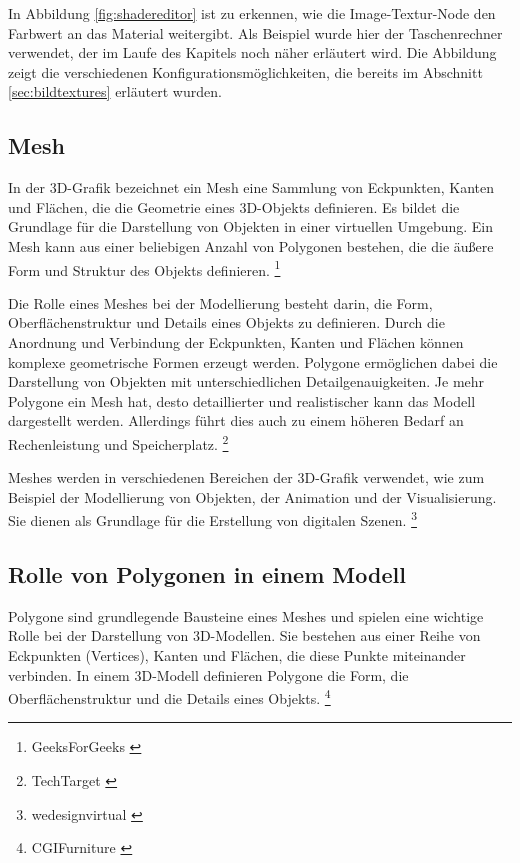 In Abbildung \ref{fig:shadereditor} ist zu erkennen, wie die Image-Textur-Node den Farbwert an das Material weitergibt. Als Beispiel wurde hier der Taschenrechner verwendet, der im Laufe des Kapitels noch näher erläutert wird. Die Abbildung zeigt die verschiedenen Konfigurationsmöglichkeiten, die bereits im Abschnitt \ref{sec:bildtextures} erläutert wurden.

\subsection{Mesh} \label{sec:mesh}
In der 3D-Grafik bezeichnet ein Mesh eine Sammlung von Eckpunkten, Kanten und Flächen, die die Geometrie eines 3D-Objekts definieren. Es bildet die Grundlage für die Darstellung von Objekten in einer virtuellen Umgebung. Ein Mesh kann aus einer beliebigen Anzahl von Polygonen bestehen, die die äußere Form und Struktur des Objekts definieren. \footnote{GeeksForGeeks \cite{Mesh Definition}}

Die Rolle eines Meshes bei der Modellierung besteht darin, die Form, Oberflächenstruktur und Details eines Objekts zu definieren. Durch die Anordnung und Verbindung der Eckpunkten, Kanten und Flächen können komplexe geometrische Formen erzeugt werden. Polygone ermöglichen dabei die Darstellung von Objekten mit unterschiedlichen Detailgenauigkeiten. Je mehr Polygone ein Mesh hat, desto detaillierter und realistischer kann das Modell dargestellt werden. Allerdings führt dies auch zu einem höheren Bedarf an Rechenleistung und Speicherplatz. \footnote{TechTarget \cite{Mesh Usages}}

Meshes werden in verschiedenen Bereichen der 3D-Grafik verwendet, wie zum Beispiel der Modellierung von Objekten, der Animation und der Visualisierung. Sie dienen als Grundlage für die Erstellung von digitalen Szenen. \footnote{wedesignvirtual \cite{WhatareMeshes}}

\subsection{Rolle von Polygonen in einem Modell}
Polygone sind grundlegende Bausteine eines Meshes und spielen eine wichtige Rolle bei der Darstellung von 3D-Modellen. Sie bestehen aus einer Reihe von Eckpunkten (Vertices), Kanten und Flächen, die diese Punkte miteinander verbinden. In einem 3D-Modell definieren Polygone die Form, die Oberflächenstruktur und die Details eines Objekts. \footnote{CGIFurniture \cite{What are Polygons}}

